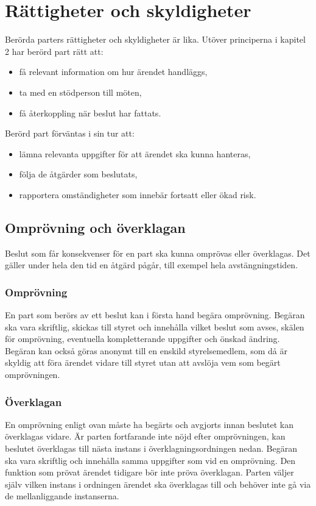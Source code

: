 \section{Rättigheter och skyldigheter}
Berörda parters rättigheter och skyldigheter är lika. Utöver principerna i kapitel 2 har berörd part rätt att:
\begin{itemize}
\item få relevant information om hur ärendet handläggs,
\item ta med en stödperson till möten,
\item få återkoppling när beslut har fattats.
\end{itemize}
Berörd part förväntas i sin tur att:
\begin{itemize}
\item lämna relevanta uppgifter för att ärendet ska kunna hanteras,
\item följa de åtgärder som beslutats,
\item rapportera omständigheter som innebär fortsatt eller ökad risk.
\end{itemize}

\subsection{Omprövning och överklagan}
Beslut som får konsekvenser för en part ska kunna omprövas eller överklagas. Det gäller under hela den tid en åtgärd pågår, till exempel hela avstängningstiden.

\subsubsection*{Omprövning}
En part som berörs av ett beslut kan i första hand begära omprövning. Begäran ska vara skriftlig, skickas till styret och innehålla vilket beslut som avses, skälen för omprövning, eventuella kompletterande uppgifter och önskad ändring. Begäran kan också göras anonymt till en enskild styrelsemedlem, som då är skyldig att föra ärendet vidare till styret utan att avslöja vem som begärt omprövningen.

\subsubsection*{Överklagan}
En omprövning enligt ovan måste ha begärts och avgjorts innan beslutet kan överklagas vidare. Är parten fortfarande inte nöjd efter omprövningen, kan beslutet överklagas till nästa instans i överklagningsordningen nedan. Begäran ska vara skriftlig och innehålla samma uppgifter som vid en omprövning. Den funktion som prövat ärendet tidigare bör inte pröva överklagan. Parten väljer själv vilken instans i ordningen ärendet ska överklagas till och behöver inte gå via de mellanliggande instanserna.

